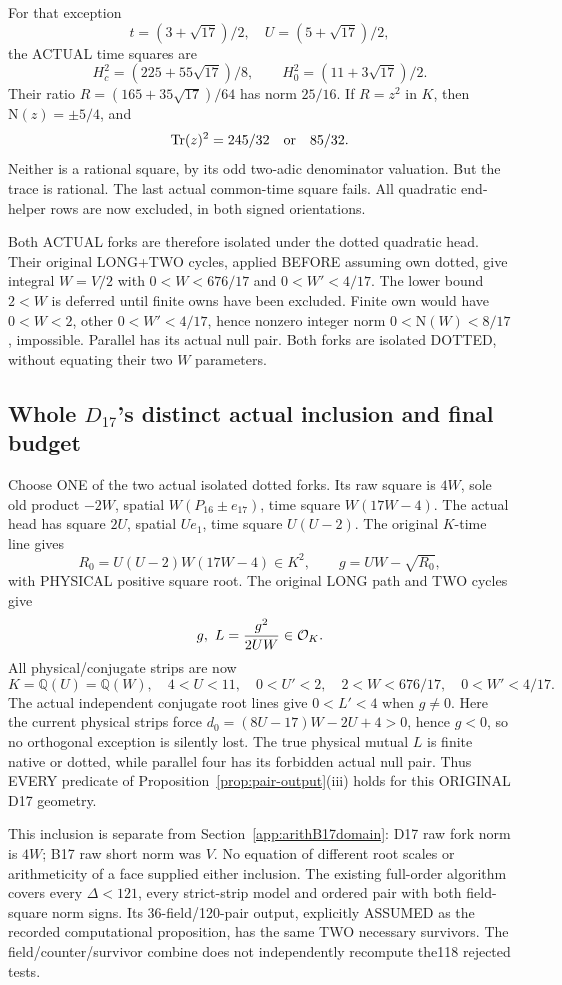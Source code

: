 \documentclass[11pt]{article}
\begin{document}
For that exception
\[
 t=(3+\sqrt{17})/2,\quad U=(5+\sqrt{17})/2,
\]
the ACTUAL time squares are
\[
 H_c^2=(225+55\sqrt{17})/8,\qquad
 H_0^2=(11+3\sqrt{17})/2 .
\]
Their ratio
\(R=(165+35\sqrt{17})/64\) has norm \(25/16\).
If \(R=z^2\) in \(K\), then
\(\mathrm N(z)=\pm5/4\), and
\[
                    \operatorname{Tr}(z)^2=245/32
                                      \quad\hbox{or}\quad85/32 .
\]
Neither is a rational square, by its odd
two-adic denominator valuation.
But the trace is rational.
The last actual common-time square fails.
All quadratic end-helper rows are now excluded,
in both signed orientations.

Both ACTUAL forks are therefore isolated under
the dotted quadratic head.
Their original LONG+TWO cycles, applied BEFORE
assuming own dotted, give integral \(W=V/2\)
with \(0<W<676/17\) and \(0<W'<4/17\).
The lower bound \(2<W\) is deferred until
finite owns have been excluded.
Finite own would have \(0<W<2\), other
\(0<W'<4/17\), hence nonzero integer norm
\(0<\mathrm N(W)<8/17\), impossible.
Parallel has its actual null pair.
Both forks are isolated DOTTED, without
equating their two \(W\) parameters.

\subsection{Whole \(D_{17}\)'s distinct actual inclusion and final budget}
\label{app:arithD17domain}

Choose ONE of the two actual isolated dotted forks.
Its raw square is \(4W\), sole old product
\(-2W\), spatial \(W(P_{16}\pm e_{17})\),
time square \(W(17W-4)\).
The actual head has square \(2U\), spatial
\(Ue_1\), time square \(U(U-2)\).
The original \(K\)-time line gives
\[
 R_0=U(U-2)W(17W-4)\in K^2,\qquad
 g=UW-\sqrt{R_0},
\]
with PHYSICAL positive square root.
The original LONG path and TWO cycles give
\[
                   g,\ L={g^2\over2UW}\in\mathcal O_K .
\]
All physical/conjugate strips are now
\[
 K=\mathbb Q(U)=\mathbb Q(W),\quad
 4<U<11,\quad0<U'<2,\quad
 2<W<676/17,\quad0<W'<4/17 .
\]
The actual independent conjugate root lines give
\(0<L'<4\) when \(g\ne0\).
Here the current physical strips force
\(d_0=(8U-17)W-2U+4>0\), hence \(g<0\),
so no orthogonal exception is silently lost.
The true physical mutual \(L\) is finite
native or dotted, while parallel four has
its forbidden actual null pair.
Thus EVERY predicate of
Proposition~\ref{prop:pair-output}(iii) holds
for this ORIGINAL D17 geometry.

This inclusion is separate from
Section~\ref{app:arithB17domain}:
D17 raw fork norm is \(4W\);
B17 raw short norm was \(V\).
No equation of different root scales or
arithmeticity of a face supplied either inclusion.
The existing full-order algorithm covers every
\(\Delta<121\), every strict-strip model and
ordered pair with both field-square norm signs.
Its 36-field/120-pair output, explicitly ASSUMED
as the recorded computational proposition, has
the same TWO necessary survivors.
The field/counter/survivor combine does not
independently recompute the118 rejected tests.
\end{document}
